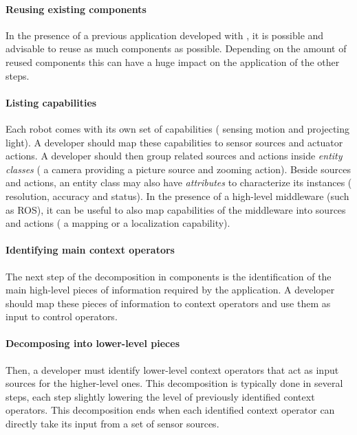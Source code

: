 \paragraph*{Reusing existing components}
In the presence of a previous application developed with \diaspec{},
it is possible and advisable to reuse as much components as possible.
Depending on the amount of reused components this can have a huge
impact on the application of the other steps.

\paragraph*{Listing capabilities}
Each robot comes with its own set of capabilities (\eg{} sensing
motion and projecting light). A developer should map these
capabilities to sensor sources and actuator actions. A developer
should then group related sources and actions inside \emph{entity
  classes} (\eg{} a camera providing a picture source and zooming
action). Beside sources and actions, an entity class may also have
\emph{attributes} to characterize its instances (\eg{} resolution,
accuracy and status). In the presence of a high-level middleware (such
as ROS), it can be useful to also map capabilities of the middleware
into sources and actions (\eg{} a mapping or a localization
capability).

\paragraph*{Identifying main context operators}
The next step of the decomposition in components is the identification
of the main high-level pieces of information required by the
application. A developer should map these pieces of information to
context operators and use them as input to control operators.

\paragraph*{Decomposing into lower-level pieces}
Then, a developer must identify lower-level context operators that act
as input sources for the higher-level ones. This decomposition is
typically done in several steps, each step slightly lowering the level
of previously identified context operators. This decomposition ends
when each identified context operator can directly take its input from
a set of sensor sources.

